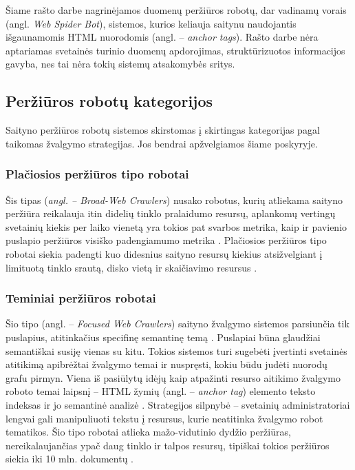 

Šiame rašto darbe nagrinėjamos duomenų peržiūros robotų, dar vadinamų vorais (angl. \textit{Web Spider Bot}), sistemos, kurios keliauja saitynu naudojantis išgaunamomis HTML nuorodomis (angl. -- \textit{anchor tags}). Rašto darbe nėra aptariamas svetainės turinio duomenų apdorojimas, struktūrizuotos informacijos gavyba, nes tai nėra tokių sistemų atsakomybės sritys.



\subsection{Peržiūros robotų kategorijos}

Saityno peržiūros robotų sistemos skirstomas į skirtingas kategorijas pagal taikomas žvalgymo strategijas. Jos bendrai apžvelgiamos šiame poskyryje.

\subsubsection{Plačiosios peržiūros tipo robotai}

Šis tipas (\textit{angl. -- Broad-Web Crawlers}) nusako robotus, kurių atliekama saityno peržiūra reikalauja itin didelių tinklo pralaidumo resursų, aplankomų vertingų svetainių kiekis per laiko vienetą yra tokios pat svarbos metrika, kaip ir pavienio puslapio peržiūros visiško padengiamumo metrika \cite{HeritrixArchitecture}. Plačiosios peržiūros tipo robotai siekia padengti kuo didesnius saityno resursų kiekius atsižvelgiant į limituotą tinklo srautą, disko vietą ir skaičiavimo resursus \cite{HeritrixArchitecture}.

\subsubsection{Teminiai peržiūros robotai}

Šio tipo (angl. -- \textit{Focused Web Crawlers}) saityno žvalgymo sistemos parsiunčia tik puslapius, atitinkačius specifinę semantinę temą \cite{CategoriesOfWebCrawlersAndOverview}. Puslapiai būna glaudžiai semantiškai susiję vienas su kitu. Tokios sistemos turi sugebėti įvertinti svetainės atitikimą apibrėžtai žvalgymo temai ir nuspręsti, kokiu būdu judėti nuorodų grafu pirmyn. Viena iš pasiūlytų idėjų kaip atpažinti resurso aitikimo žvalgymo roboto temai laipsnį -- HTML žymių (angl. -- \textit{anchor tag}) elemento teksto indeksas ir jo semantinė analizė \cite{AnchorTagsSemanticAnalysis}. Strategijos silpnybė -- svetainių administratoriai lengvai gali manipuliuoti tekstu į resursus, kurie neatitinka žvalgymo robot tematikos. Šio tipo robotai atlieka mažo-vidutinio dydžio peržiūras, nereikalaujančias ypač daug tinklo ir talpos resursų, tipiškai tokios peržiūros siekia iki 10 mln. dokumentų \cite{HeritrixArchitecture}.


